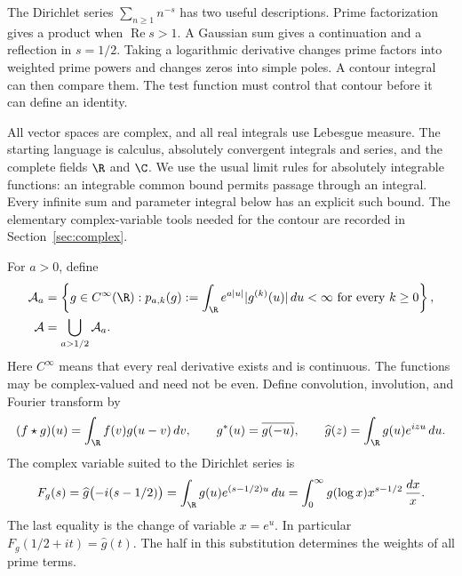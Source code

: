 The Dirichlet series $\sum_{n\geq1}n^{-s}$ has two useful descriptions.
Prime factorization gives a product when $\operatorname{Re}s>1$.
A Gaussian sum gives a continuation and a reflection in $s=1/2$.
Taking a logarithmic derivative changes prime factors into weighted prime
powers and changes zeros into simple poles.  A contour integral can then
compare them.  The test function must control that contour before it can
define an identity.

All vector spaces are complex, and all real integrals use Lebesgue measure.
The starting language is calculus, absolutely convergent integrals and
series, and the complete fields $\R$ and $\C$.
We use the usual limit rules for absolutely integrable functions: an
integrable common bound permits passage through an integral.
Every infinite sum and parameter integral below has an explicit such bound.
The elementary complex-variable tools needed for the contour are recorded
in Section~\ref{sec:complex}.

For $a>0$, define
\begin{equation}
 \begin{aligned}
 \A_a&=\left\{g\in C^\infty(\R):
   p_{a,k}(g):=\int_{\R}e^{a|u|}|g^{(k)}(u)|\,du<\infty
                     \text{ for every }k\geq0\right\},\\
 \A&=\bigcup_{a>1/2}\A_a.
 \end{aligned}
 \label{eq:test-class}
\end{equation}
Here $C^\infty$ means that every real derivative exists and is continuous.
The functions may be complex-valued and need not be even.
Define convolution, involution, and Fourier transform by
\begin{equation}
 (f\star g)(u)=\int_{\R}f(v)g(u-v)\,dv,
 \qquad g^*(u)=\overline{g(-u)},
 \qquad \widehat g(z)=\int_{\R}g(u)e^{izu}\,du.
 \label{eq:operations}
\end{equation}
The complex variable suited to the Dirichlet series is
\begin{equation}
 F_g(s)=\widehat g\bigl(-i(s-1/2)\bigr)
       =\int_{\R}g(u)e^{(s-1/2)u}\,du
       =\int_0^\infty g(\log x)x^{s-1/2}\,\frac{dx}{x}.
 \label{eq:centered-mellin}
\end{equation}
The last equality is the change of variable $x=e^u$.
In particular $F_g(1/2+it)=\widehat g(t)$.
The half in this substitution determines the weights of all prime terms.

